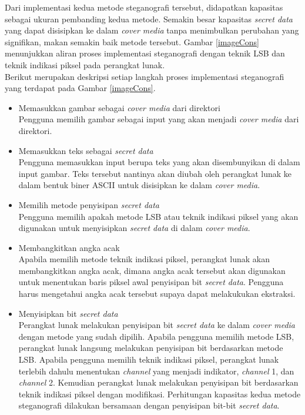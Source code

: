 \documentclass[a4paper,twoside]{article}
\begin{document}
\begin{enumerate}
		Dari implementasi kedua metode steganografi tersebut, didapatkan kapasitas sebagai ukuran pembanding kedua metode. Semakin besar kapasitas \textit{secret data} yang dapat disisipkan ke dalam \textit{cover media} tanpa menimbulkan perubahan yang signifikan, makan semakin baik metode tersebut. Gambar \ref{imageCons} menunjukkan aliran proses implementasi steganografi dengan teknik LSB dan teknik indikasi piksel pada perangkat lunak.\\
		
		Berikut merupakan deskripsi setiap langkah proses implementasi steganografi yang terdapat pada Gambar \ref{imageCons}.
		
		\begin{itemize}
		\item Memasukkan gambar sebagai \textit{cover media} dari direktori\\
		Pengguna memilih gambar sebagai input yang akan menjadi \textit{cover media} dari direktori.
		\item Memasukkan teks sebagai \textit{secret data}\\
		Pengguna memasukkan input berupa teks yang akan disembunyikan di dalam input gambar. Teks tersebut nantinya akan diubah oleh perangkat lunak ke dalam bentuk biner ASCII untuk disisipkan ke dalam \textit{cover media}.
		\item Memilih metode penyisipan \textit{secret data}\\
		Pengguna memilih apakah metode LSB atau teknik indikasi piksel yang akan digunakan untuk menyisipkan \textit{secret data} di dalam \textit{cover media}.
		\item Membangkitkan angka acak\\
		Apabila memilih metode teknik indikasi piksel, perangkat lunak akan membangkitkan angka acak, dimana angka acak tersebut akan digunakan untuk menentukan baris piksel awal penyisipan bit \textit{secret data}. Pengguna harus mengetahui angka acak tersebut supaya dapat melakukukan ekstraksi.
		\item Menyisipkan bit \textit{secret data}\\
		Perangkat lunak melakukan penyisipan bit \textit{secret data} ke dalam \textit{cover media} dengan metode yang sudah dipilih. Apabila pengguna memilih metode LSB, perangkat lunak langsung melakukan penyisipan bit berdasarkan metode LSB. Apabila pengguna memilih teknik indikasi piksel, perangkat lunak terlebih dahulu menentukan \textit{channel} yang menjadi indikator, \textit{channel} 1, dan \textit{channel} 2. Kemudian perangkat lunak melakukan penyisipan bit berdasarkan teknik indikasi piksel dengan modifikasi. Perhitungan kapasitas kedua metode steganografi dilakukan bersamaan dengan penyisipan bit-bit \textit{secret data}.

\end{itemize}
\end{enumerate}
\end{document}
